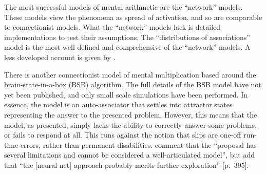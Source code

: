  The most successful models of mental arithmetic are the
``network'' models.  These models view the phenomena as spread of
activation, and so are comparable to connectionist models. What the
``network'' models lack is detailed implementations to test their
assumptions. The ``distributions of associations'' model \cite{siegmult} is
the most well defined and comprehensive of the ``network'' models. A less
developed account is given by .

There is another connectionist model of mental multiplication
\cite{andestud,viscrepr} based around the brain-state-in-a-box
(BSB) algorithm.   The full details of the BSB model have not yet been
published, and only small scale simulations have been performed.  In
essence, the model is an auto-associator that settles into attractor states
representing the answer to the presented problem.  However, this means that
the model, as presented, simply lacks the ability to correctly answer some
problems, or fails to respond at all.  This runs against the notion that
slips are one-off run-time errors, rather than permanent disabilities.
 comment that the  ``proposal has several
limitations and cannot be considered a well-articulated model'', but add
that ``the [neural net] approach probably merits further exploration''
[p.~395].





